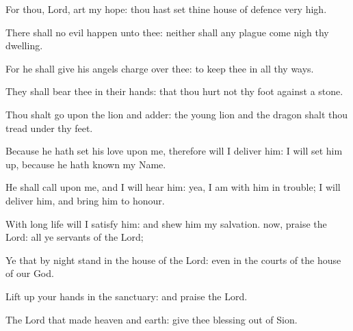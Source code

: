 For thou, Lord, art my hope: thou hast set thine house of defence very high.
\par
There shall no evil happen unto thee: neither shall any plague come nigh thy dwelling.
\par
For he shall give his angels charge over thee: to keep thee in all thy ways.
\par
They shall bear thee in their hands: that thou hurt not thy foot against a stone.
\par
Thou shalt go upon the lion and adder: the young lion and the dragon shalt thou tread under thy feet.
\par
Because he hath set his love upon me, therefore will I deliver him: I will set him up, because he hath known my Name.
\par
He shall call upon me, and I will hear him: yea, I am with him in trouble; I will deliver him, and bring him to honour.
\par
With long life will I satisfy him: and shew him my salvation.
 now, praise the Lord: all ye servants of the Lord;
\par
Ye that by night stand in the house of the Lord: even in the courts of the house of our God.
\par
Lift up your hands in the sanctuary: and praise the Lord.
\par
The Lord that made heaven and earth: give thee blessing out of Sion.
